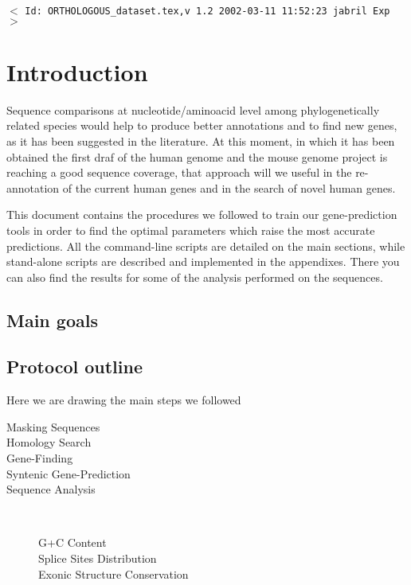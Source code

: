 \documentclass[11pt]{article}
\newcommand{\sctn}[1]{\section{#1}}
\newcommand{\subsctn}[1]{\subsection{#1}}
\begin{document}
\tableofcontents
\listoftables
\listoffigures

\vfill
\begin{center}
{\small$<$ \verb$Id: ORTHOLOGOUS_dataset.tex,v 1.2 2002-03-11 11:52:23 jabril Exp $$>$ }
\end{center}


\newpage
{}
\setcounter{page}{1}

\sctn{Introduction}

Sequence comparisons at nucleotide/aminoacid level among phylogenetically related species would help to produce better annotations and to find new genes, as it has been suggested in the literature. At this moment, in which it has been obtained the first draf of the human genome and the mouse genome project is reaching a good sequence coverage, that approach will we useful in the re-annotation of the current human genes and in the search of novel human genes. 
\begin{comment}
Homology between human and mouse sequences serves as a useful guide for identifying genes in both organisms. Additionally, conserved sequences that have no coding potential are good candidates for regulatory elements.
-- From \url|http://bio.cse.psu.edu/mousegroup/doc.html|
An annotation of the orthologous test set of genomic sequences and their regulatory regions is available at \url|http://bio.cse.psu.edu/mousegroup/test8/|
\end{comment}

This document contains the procedures we followed to train our gene-prediction tools in order to find the optimal parameters which raise the most accurate predictions. All the command-line scripts are detailed on the main sections, while stand-alone scripts are described and implemented in the appendixes. There you can also find the results for some of the analysis performed on the sequences. 

\subsctn{Main goals}

\subsctn{Protocol outline}

Here we are drawing the main steps we followed 

\begin{description}
 \item[Masking Sequences]
 \item[Homology Search]
 \item[Gene-Finding]
 \item[Syntenic Gene-Prediction]
 \item[Sequence Analysis] \ \\
   \begin{description}
    \item[G+C Content]
    \item[Splice Sites Distribution]
    \item[Exonic Structure Conservation]
   \end{description}
\end{description}
\end{document}
